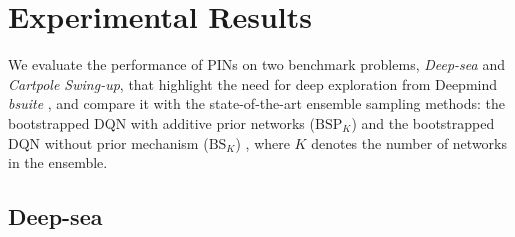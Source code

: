 \documentclass[letterpaper]{article} %
\theoremstyle{definition}
\begin{document}
\section{Experimental Results}

We evaluate the performance of PINs on two benchmark problems, \textit{Deep-sea} and \textit{Cartpole Swing-up}, that highlight the need for deep exploration from Deepmind \textit{bsuite} \cite{osband2019bsuite}, and compare it with the state-of-the-art ensemble sampling methods: the bootstrapped DQN with additive prior networks ($\mathrm{BSP}_K$) \cite{osband2018randomized} and the bootstrapped DQN without prior mechanism ($\mathrm{BS}_{K}$) \cite{osband2016deep}, where $K$ denotes the number of networks in the ensemble.

\subsection{Deep-sea}
\end{document}
